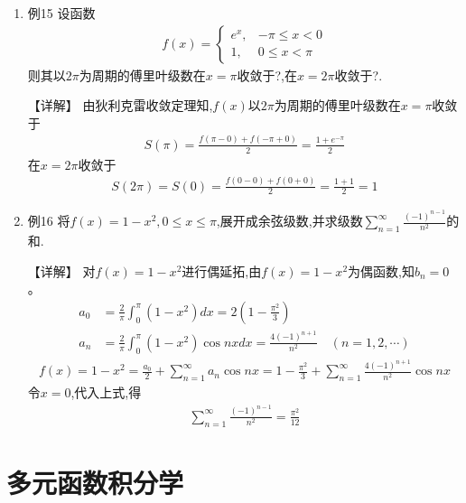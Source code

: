\documentclass[12pt, a4paper, oneside, UTF8]{ctexbook}
\begin{document}
\begin{enumerate}[label=\arabic*.,start=15]
    \item 例15 设函数
    \begin{align*}
    f(x)=\begin{cases}
    e^x, & -\pi\leq x<0 \\
    1, & 0\leq x<\pi
    \end{cases}
    \end{align*}
    则其以$2\pi$为周期的傅里叶级数在$x=\pi$收敛于?,在$x=2\pi$收敛于?.
    \begin{solution}
    【详解】
    由狄利克雷收敛定理知,$f(x)$以$2\pi$为周期的傅里叶级数在$x=\pi$收敛于
    \begin{align*}
    S(\pi)=\frac{f(\pi-0)+f(-\pi+0)}{2}=\frac{1+e^{-\pi}}{2}
    \end{align*}
    在$x=2\pi$收敛于
    \begin{align*}
    S(2\pi)=S(0)=\frac{f(0-0)+f(0+0)}{2}=\frac{1+1}{2}=1
    \end{align*}
    \end{solution}
    
    \item 例16 将$f(x)=1-x^2,0\leq x\leq\pi$,展开成余弦级数,并求级数$\sum_{n=1}^{\infty}\frac{(-1)^{n-1}}{n^2}$的和.
    
    \begin{solution}
    【详解】
    对$f(x)=1-x^2$进行偶延拓,由$f(x)=1-x^2$为偶函数,知$b_n=0$。
    \begin{align*}
    a_0&=\frac{2}{\pi}\int_0^\pi(1-x^2)dx=2\left(1-\frac{\pi^2}{3}\right) \\
    a_n&=\frac{2}{\pi}\int_0^\pi(1-x^2)\cos nx dx=\frac{4(-1)^{n+1}}{n^2} \quad (n=1,2,\cdots)
    \end{align*}
    \begin{align*}
    f(x)=1-x^2=\frac{a_0}{2}+\sum_{n=1}^{\infty}a_n\cos nx=1-\frac{\pi^2}{3}+\sum_{n=1}^{\infty}\frac{4(-1)^{n+1}}{n^2}\cos nx
    \end{align*}
    令$x=0$,代入上式,得
    \begin{align*}
    \sum_{n=1}^{\infty}\frac{(-1)^{n-1}}{n^2}=\frac{\pi^2}{12}
    \end{align*}
    \end{solution}
\end{enumerate}

\section{多元函数积分学}
\end{document}
